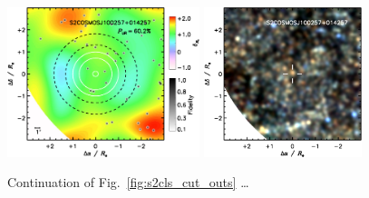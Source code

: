 \documentclass[a4paper, fleqn, usenatbib]{mnras}
\begin{document}
\begin{figure}
    \includegraphics[width=0.5\textwidth]{S2COSMOSJ100257+014257-overdensity}
    \includegraphics[width=0.41\textwidth]{S2COSMOSJ100257+014257-spire-rgb}
    \caption{Continuation of Fig.~\ref{fig:s2cls_cut_outs} \ldots}
\end{figure}


\bsp	%
\label{lastpage}
\end{document}
